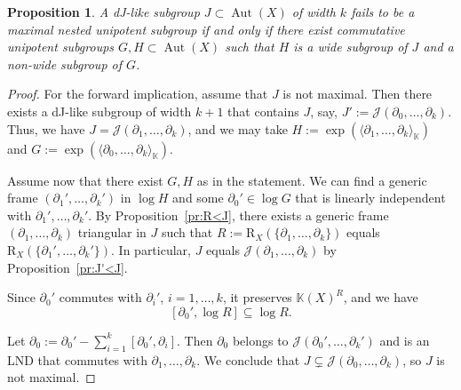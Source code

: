 \documentclass[12pt,a4paper]{amsart}
\theoremstyle{plain}
\newtheorem{proposition}[theorem]{Proposition}
\theoremstyle{definition}
\theoremstyle{remark}
\def\Aut{\operatorname{Aut}}
\def\K{{\mathbb K}}
\def\J{{\mathcal J}}
\begin{document}
   \begin{proposition}\label{pr:dJ-max-criterion}
      A dJ-like subgroup $J\subset\Aut(X)$ of width $k$ fails to be a maximal nested unipotent subgroup if and only if 
      there exist commutative unipotent subgroups $G, H \subset \Aut(X)$ such that $H$ is a wide subgroup of $J$ and a non-wide subgroup of $G$.
   \end{proposition}
\begin{proof}
For the forward implication, assume that $J$ is not maximal.
Then there exists a dJ-like subgroup of width $k+1$ that contains $J$, say, $J':=\J(\partial_0,\ldots,\partial_k)$.
Thus, we have $J=\J(\partial_1,\ldots,\partial_k)$, and we may take $H:=\exp(\langle \partial_1,\ldots,\partial_k\rangle_\K)$ and $G:=\exp(\langle \partial_0,\ldots,\partial_k\rangle_\K)$.

Assume now that there exist $G,H$ as in the statement.
   We can find a generic frame $(\partial_1',\ldots,\partial_k')$ in $\log H$ and some $\partial_0'\in\log G$ that is linearly independent with $\partial_1',\ldots,\partial_k'.$
   By Proposition~\ref{pr:R<J}, there exists a generic frame $(\partial_1,\ldots,\partial_k)$ triangular in $J$ such that $R:=\mathrm{R}_X(\{\partial_1,\ldots,\partial_k\})$ equals $\mathrm{R}_X(\{\partial_1',\ldots,\partial_k'\})$.
   In particular, $J$ equals $\J(\partial_1,\ldots,\partial_k)$ by Proposition~\ref{pr:J'<J}.

      Since $\partial_0'$ commutes with $\partial_i'$, $i=1,\ldots,k$, it preserves $\K(X)^R$, and we have \[[\partial_0',\log R]\subseteq \log R.\]
   
   Let $\partial_0:=\partial_0'-\sum_{i=1}^k[\partial_0',\partial_i]$.
   Then $\partial_0$ belongs to $\J(\partial_0',\ldots,\partial_k')$ and is an LND that commutes with $\partial_1,\ldots,\partial_k$.
   We conclude that $J\subsetneq\J(\partial_0,\ldots,\partial_k)$, so $J$ is not maximal.
\end{proof}
   
 
\end{document}
